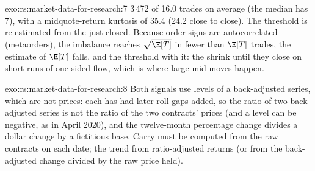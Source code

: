 \begin{solution}{exo:rs:market-data-for-research:7}
3\,472  of 16.0 trades on average (the median  has 7), with a midquote-return kurtosis of 35.4 (24.2 close to close).
The threshold is re-estimated from the  just closed. Because order signs are autocorrelated (metaorders), the imbalance
reaches $\sqrt{\E[T]}$ in fewer than $\E[T]$ trades, the estimate of $\E[T]$ falls, and the threshold with it: the 
shrink until they close on short runs of one-sided flow, which is where large mid moves happen.
\end{solution}

\begin{solution}{exo:rs:market-data-for-research:8}
Both signals use levels of a back-adjusted series, which are not prices: each has had later roll gaps added, so the ratio of two
back-adjusted series is not the ratio of the two contracts' prices (and a level can be negative, as in April 2020), and the
twelve-month percentage change divides a dollar change by a fictitious base. Carry must be computed from the raw contracts on
each date; the trend from ratio-adjusted returns (or from the back-adjusted change divided by the raw price held).
\end{solution}


